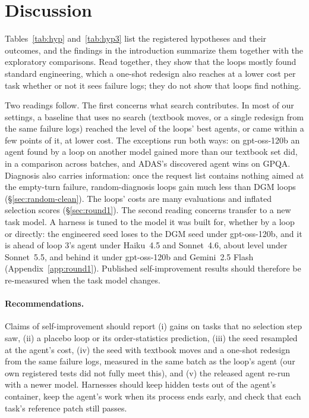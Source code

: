 \section{Discussion}\label{sec:discussion}


Tables~\ref{tab:hyp} and~\ref{tab:hyp3} list the registered hypotheses and their outcomes, and the findings in the introduction
summarize them together with the exploratory comparisons. Read together, they show that the loops mostly
found standard engineering, which a one-shot redesign also reaches at a lower cost per task whether or not it sees
failure logs; they do not show that loops find nothing.

Two readings follow. The first concerns what search contributes. In most of our settings, a baseline that uses no
search (textbook moves, or a single redesign from the same failure logs) reached the level of the loops' best agents,
or came within a few points of it, at lower cost. The exceptions run both ways: on gpt-oss-120b an agent found by a loop
on another model gained more than our textbook set did, in a comparison across batches, and ADAS's discovered agent wins on GPQA.
Diagnosis also carries information: once the request list contains nothing aimed at the empty-turn failure,
random-diagnosis loops gain much less than DGM loops (\S\ref{sec:random-clean}). The loops' costs are
many evaluations and inflated selection scores (\S\ref{sec:round1}). The second reading concerns transfer to a
new task model. A harness is tuned to the model it was built for, whether by a loop or directly: the engineered seed
loses to the DGM seed under gpt-oss-120b, and it is ahead of loop 3's agent under Haiku~4.5 and Sonnet~4.6, about
level under Sonnet~5.5, and behind it under gpt-oss-120b and Gemini~2.5 Flash (Appendix~\ref{app:round1}). Published
self-improvement results should therefore be re-measured when the task model changes.

\paragraph{Recommendations.} Claims of self-improvement should report (i) gains on tasks that no selection step saw,
(ii) a placebo loop or its order-statistics prediction, (iii) the seed resampled at the agent's cost, (iv) the seed
with textbook moves and a one-shot redesign from the same failure logs, measured in the same batch as the loop's agent
(our own registered tests did not fully meet this), and (v) the released agent re-run with a newer model. Harnesses
should keep hidden tests out of the agent's container, keep the agent's work when its process ends early, and check that
each task's reference patch still passes.

